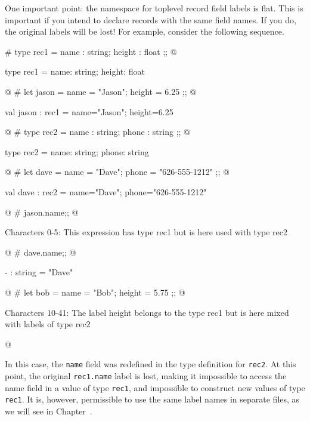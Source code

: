 
One important point: the namespace for toplevel record field labels is
flat.  This is important if you intend to declare records with the
same field names.  If you do, the original labels will be lost!  For
example, consider the following sequence.

\begin{ocaml}
# type rec1 = { name : string; height : float };;
@
\begin{topoutput}
type rec1 = { name: string; height: float }
\end{topoutput}
@
# let jason = { name = "Jason"; height = 6.25 };;
@
\begin{topoutput}
val jason : rec1 = {name="Jason"; height=6.25}
\end{topoutput}
@
# type rec2 = { name : string; phone : string };;
@
\begin{topoutput}
type rec2 = { name: string; phone: string }
\end{topoutput}
@
# let dave = { name = "Dave"; phone = "626-555-1212" };;
@
\begin{topoutput}
val dave : rec2 = {name="Dave"; phone="626-555-1212"}
\end{topoutput}
@
# jason.name;;
@
\begin{toperror}
Characters 0-5:
This expression has type rec1 but is here used with type rec2
\end{toperror}
@
# dave.name;;
@
\begin{topoutput}
- : string = "Dave"
\end{topoutput}
@
# let bob = { name = "Bob"; height = 5.75 };;
@
\begin{toperror}
Characters 10-41:
The label height belongs to the type rec1
but is here mixed with labels of type rec2
\end{toperror}
@
\end{ocaml}
%
In this case, the \hbox{\lstinline/name/} field was redefined in the
type definition for \hbox{\lstinline/rec2/}.  At this point, the
original \hbox{\lstinline/rec1.name/} label is lost, making it
impossible to access the name field in a value of type
\hbox{\lstinline/rec1/}, and impossible to construct new values of
type \hbox{\lstinline/rec1/}.  It is, however, permissible to use the
same label names in separate files, as we will see in
Chapter~.


